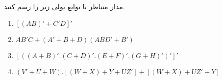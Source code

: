 مدار متناظر با توابع بولی زیر را رسم کنید.

\begin{latin}
	\begin{enumerate}
		\item 
		$[(AB)' + C'D]'$
		
		\item 
		$AB'C + (A' + B + D)(ABD' + B')$
		
		\item 
		$[ ((A + B)' . (C + D)' . (E + F)' . (G + H)')']'$
		
		\item 
		$(V' + U + W).[(W + X) + Y + UZ'] + [ (W + X) + UZ' + Y ]$
	\end{enumerate}
\end{latin}

%		
